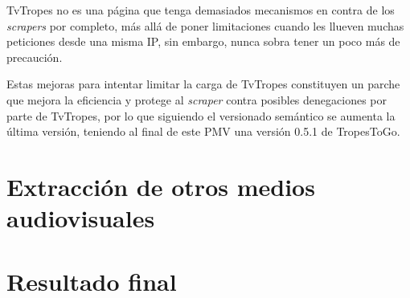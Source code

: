 TvTropes no es una página que tenga demasiados mecanismos en contra de los
\textit{scrapers} por completo, más allá de poner limitaciones cuando les
llueven muchas peticiones desde una misma IP, sin embargo, nunca sobra tener un
poco más de precaución.

Estas mejoras para intentar limitar la carga de TvTropes constituyen un parche
que mejora la eficiencia y protege al \textit{scraper} contra posibles
denegaciones por parte de TvTropes, por lo que siguiendo el versionado semántico
se aumenta la última versión, teniendo al final de este PMV una versión 0.5.1 de
TropesToGo.

\section{Extracción de otros medios audiovisuales}
\section{Resultado final}